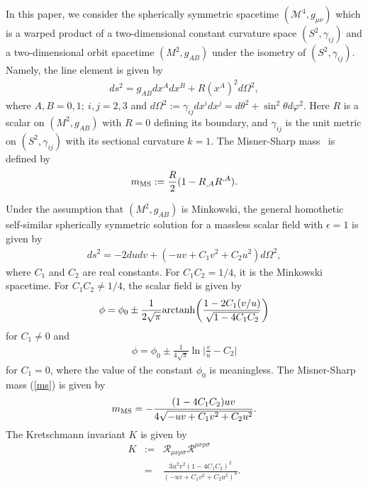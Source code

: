 \documentclass[aps,prd,twocolumn,eqsecnum,showpacs,amsmath]{revtex4}
\newcommand{\ma}[1]{\mbox{$\mathcal{#1}$}}
\begin{document}
In this paper, we consider the spherically symmetric spacetime $({\ma M}^4, g_{\mu \nu })$ which is a warped product of a 
two-dimensional constant curvature space $(S^2, \gamma _{ij})$ and a two-dimensional orbit spacetime $(M^2, g_{AB})$ under the isometry of $(S^2, \gamma _{ij})$. 
Namely, the line element is given by
\begin{eqnarray}
ds^2=g_{AB}dx^Adx^B+R(x^A)^2d\Omega^2,\label{sol2}
\end{eqnarray}
where $A,B = 0, 1;~i,j = 2, 3$ and $d\Omega^2:=\gamma _{ij}dx^idx^j=d\theta^2+\sin^2\theta d\varphi^2$.
Here $R$ is a scalar on $(M^2, g_{AB})$ with $R=0$ defining its boundary, and $\gamma_{ij}$ is the unit
metric on $(S^2, \gamma _{ij})$ with its sectional curvature $k = 1$. 
The Misner-Sharp mass~\cite{ms1964} is defined by
\begin{eqnarray}
m_{\rm MS}:=\frac{R}{2}(1-R_{,A}R^{,A}). \label{ms}
\end{eqnarray}

Under the assumption that $(M^2, g_{AB})$ is Minkowski, the general homothetic self-similar spherically symmetric solution for a massless scalar field with $\epsilon=1$ is given by 
\begin{eqnarray}
ds^2=-2dudv+(-uv+C_1v^2+C_2u^2)d\Omega^2, \label{roberts1}
\end{eqnarray}
where $C_1$ and $C_2$ are real constants.
For $C_1C_2=1/4$, it is the Minkowski spacetime.
For $C_1C_2 \ne 1/4$, the scalar field is given by 
\begin{eqnarray}
\phi=\phi_0\pm \frac{1}{2\sqrt{\pi}}{\rm arctanh}\biggl(\frac{1-2C_1(v/u)}{\sqrt{1-4C_1C_2}}\biggl) \label{roberts2}
\end{eqnarray}
for $C_1 \ne 0$ and
\begin{eqnarray}
\phi=\phi_0\pm \frac{1}{4\sqrt{\pi}}\ln\biggl|\frac{v}{u}-C_2\biggl| \label{g-hayward2}
\end{eqnarray}
for $C_1=0$, where the value of the constant $\phi_0$ is meaningless.
The Misner-Sharp mass (\ref{ms}) is given by
\begin{eqnarray}
m_{\rm MS}=-\frac{(1-4C_1C_2)uv}{4\sqrt{-uv+C_1v^2+C_2u^2}}. \label{roberts-mass}
\end{eqnarray}
The Kretschmann invariant $K$ is given by
\begin{eqnarray}
K&:=&{\ma R}_{\mu\nu\rho\sigma}{\ma R}^{\mu\nu\rho\sigma} \nonumber \\
&=&\frac{3u^2v^2(1-4C_1C_2)^2}{(-uv+C_1v^2+C_2u^2)^4}. \label{k-invariant}
\end{eqnarray}
\end{document}
